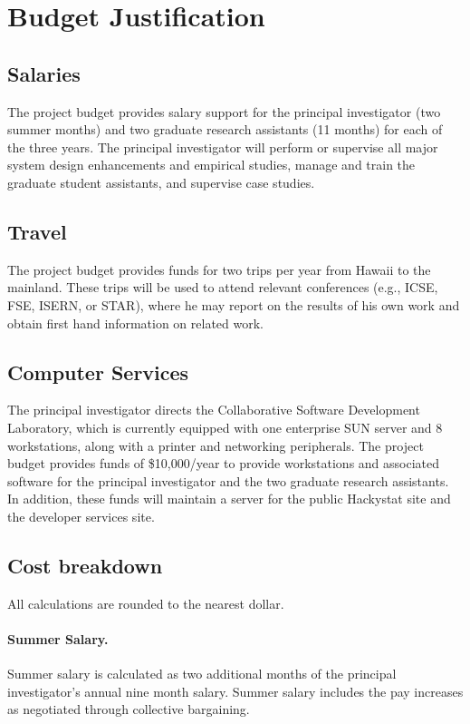 \documentclass[11pt]{article}
\begin{document}
\pagestyle{empty}
\section*{Budget Justification}

\subsection*{Salaries}

The project budget provides salary support for the principal investigator
(two summer months) and two graduate research
assistants (11 months) for each of the three years.  The principal
investigator will perform or supervise all major system design enhancements
and empirical studies, manage and train the graduate student
assistants, and supervise case studies. 

\subsection*{Travel}

The project budget provides funds for two trips per year from Hawaii to the
mainland.  These trips will be used to attend
relevant conferences (e.g., ICSE, FSE, ISERN, or STAR), where
he may report on the results of his own work and obtain first hand
information on related work. 

\subsection*{Computer Services}

The principal investigator directs the Collaborative Software Development
Laboratory, which is currently equipped with one enterprise SUN server and
8 workstations, along with a printer and networking
peripherals.  The project budget provides funds of \$10,000/year to 
provide workstations and associated software for the principal investigator and 
the two graduate research assistants. In addition, these funds will maintain 
a server for the public Hackystat site and the developer services site. 

\subsection*{Cost breakdown}
\label{cost-breakdown}

All calculations are rounded to the nearest dollar.

\paragraph{Summer Salary.}  
Summer salary is calculated as two additional months of the principal
investigator's annual nine month salary.  Summer salary includes the pay
increases as negotiated through collective bargaining. 
 
\end{document}
